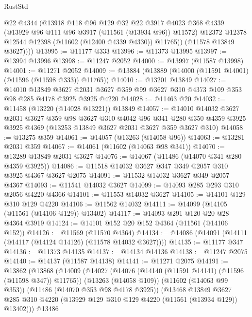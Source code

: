 \begin{lexlean}{RustStd}
\begin{coremodule}
            @22
            @4344
            (@13918
              @118
              @96
              @129
              @32
              @22
              @3917
              @4023
              @368
              @4339
              (@13929 @96 @111 @96 @3917 (@11561 (@13934 @96)) @11572)
              @12372
              @12378
              @12544
              @12398
              (@11602 (@12400 @4339 @4330))
              @11765))
          (@11578 @13849 @3627))))
@13995 := @11177 @333
@13996 := @11373 @13995
@13997 := @13994 @13996
@13998 := @11247 @2052
@14000 := @13997 (@11587 @13998)
@14001 := @11271 @2052
@14009 := @13884 (@13889 (@14000 (@11591 @14001) (@11596 (@11598 @333)) @11765))
@14010 := @13201 @13849
@14027 := @14010
    @13849
    @3627
    @2031
    @3627
    @359
    @99
    @3627
    @310
    @4373
    @109
    @353
    @98
    @285
    @4178
    @3925
    @3925
    @4220
@14028 := @11463 @20
@14032 := @11458 (@13220 (@14028 @13221)) @13849
@14057 := @14010
    @14032
    @3627
    @2031
    @3627
    @359
    @98
    @3627
    @310
    @4042
    @96
    @341
    @280
    @350
    @4359
    @3925
    @3925
    @4369
    (@13253 @13849 @3627 @2031 @3627 @359 @3627 @310)
@14058 := @13275 @359
@14061 := @14057 (@13263 (@14058 @96))
@14063 := @13281 @2031 @359
@14067 := @14061 (@11602 (@14063 @98 @341))
@14070 := @13289 @13849 @2031 @3627
@14076 := @14067 (@11486 (@14070 @341 @280 @4359 @3925))
@14086 := @11518 @14032 @3627 @347 @349 @2057 @310 @3925 @4367 @3627 @2075
@14091 := @11532 @14032 @3627 @349 @2057 @4367
@14093 := @11541 @14032 @3627
@14099 := @14093 @285 @293 @310 @2056 @4220 @4366
@14101 := @11553 @14032 @3627
@14105 := @14101 @129 @310 @129 @4220
@14106 := @11562 @14032
@14111 := @14099 (@14105 (@11561 (@14106 @129)) @13402)
@14117 := @14093 @291 @120 @20 @28 @4364 @3919
@14124 := @14101 @152 @20 @152 @4364 (@11561 (@14106 @152))
@14126 := @11569 (@11570 @4364)
@14134 := @14086 (@14091 (@14111 (@14117 (@14124 @14126) (@11578 @14032 @3627))))
@14135 := @11177 @347
@14136 := @11373 @14135
@14137 := @14134 @14136
@14138 := @11247 @2075
@14140 := @14137 (@11587 @14138)
@14141 := @11271 @2075
@14191 := @13862
    (@13868
      (@14009
        (@14027
          (@14076 (@14140 (@11591 @14141) (@11596 (@11598 @347)) @11765))
          (@13263 (@14058 @109))
          (@11602 (@14063 @99 @353))
          (@11486 (@14070 @353 @98 @4178 @3925))
          (@13468
            @13849
            @3627
            @285
            @310
            @4220
            (@13929 @129 @310 @129 @4220 (@11561 (@13934 @129)) @13402)))
        @13486

\end{coremodule}
\end{lexlean}
